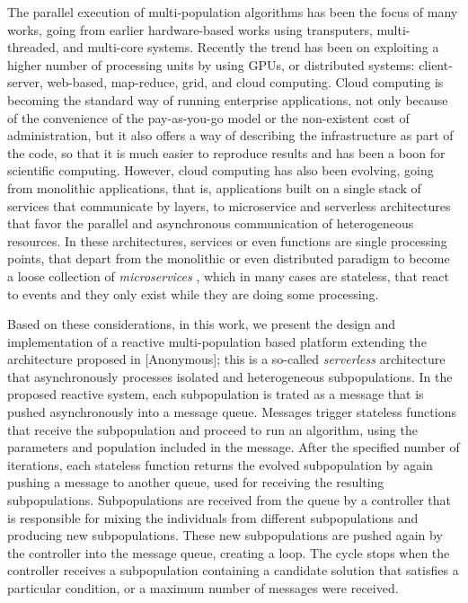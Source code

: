 \documentclass[review]{elsarticle}
\begin{document}
The parallel execution of multi-population algorithms has been the focus of many
works,  going from earlier hardware-based works using transputers,
multi-threaded, and multi-core systems. Recently the trend has been on
exploiting a higher number of processing units by using GPUs, or distributed
systems: client-server, web-based, map-reduce,  grid, and cloud computing. Cloud
computing is becoming the standard way of running enterprise applications, not
only because of the convenience of the pay-as-you-go model or the non-existent
cost of administration, but it also offers a way of describing the
infrastructure as part of the code, so that it is much easier to reproduce
results and has been a boon for scientific computing.  However,  cloud computing
has also been evolving, going from monolithic applications, that is,
applications built on a single stack of services that communicate by layers, to
microservice and serverless architectures that favor the parallel and
asynchronous communication of heterogeneous resources. In these architectures,
services or even functions are single processing points, that depart from the
monolithic or even distributed paradigm to become a loose collection of {\em
microservices} \cite{microservices}, which in many cases are stateless, that
react to events and they only exist while they are doing some processing. 

Based on these considerations, in this work, we present the design and
implementation of a reactive multi-population based platform extending the
architecture proposed in [Anonymous]; this is a so-called {\em serverless}
architecture that asynchronously processes isolated and heterogeneous
subpopulations. In the proposed reactive system, each subpopulation is trated as
a message that is pushed asynchronously into a message queue. Messages trigger
stateless functions that receive the subpopulation and proceed to run an
algorithm, using the parameters and population included in the message. After
the specified number of iterations, each stateless function returns the evolved
subpopulation by again pushing a message to another queue, used for receiving
the resulting subpopulations. Subpopulations are received from the queue by a
controller that is responsible for mixing the individuals from different
subpopulations and producing new subpopulations. These new subpopulations are
pushed again by the controller into the message queue, creating a loop. The
cycle stops when the controller receives a subpopulation containing a candidate
solution that satisfies a particular condition, or a maximum number of messages
were received. 
\end{document}
